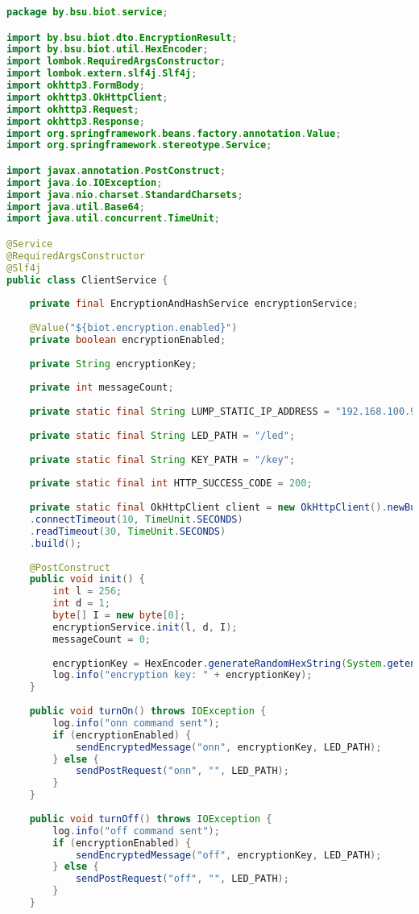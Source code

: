 \begin{lstlisting}[language=Java,label=client-code]
package by.bsu.biot.service;

import by.bsu.biot.dto.EncryptionResult;
import by.bsu.biot.util.HexEncoder;
import lombok.RequiredArgsConstructor;
import lombok.extern.slf4j.Slf4j;
import okhttp3.FormBody;
import okhttp3.OkHttpClient;
import okhttp3.Request;
import okhttp3.Response;
import org.springframework.beans.factory.annotation.Value;
import org.springframework.stereotype.Service;

import javax.annotation.PostConstruct;
import java.io.IOException;
import java.nio.charset.StandardCharsets;
import java.util.Base64;
import java.util.concurrent.TimeUnit;

@Service
@RequiredArgsConstructor
@Slf4j
public class ClientService {
	
	private final EncryptionAndHashService encryptionService;
	
	@Value("${biot.encryption.enabled}")
	private boolean encryptionEnabled;
	
	private String encryptionKey;
	
	private int messageCount;
	
	private static final String LUMP_STATIC_IP_ADDRESS = "192.168.100.93";
	
	private static final String LED_PATH = "/led";
	
	private static final String KEY_PATH = "/key";
	
	private static final int HTTP_SUCCESS_CODE = 200;
	
	private static final OkHttpClient client = new OkHttpClient().newBuilder()
	.connectTimeout(10, TimeUnit.SECONDS)
	.readTimeout(30, TimeUnit.SECONDS)
	.build();
	
	@PostConstruct
	public void init() {
		int l = 256;
		int d = 1;
		byte[] I = new byte[0];
		encryptionService.init(l, d, I);
		messageCount = 0;
		
		encryptionKey = HexEncoder.generateRandomHexString(System.getenv("INITIAL_ENCRYPTION_KEY").length());
		log.info("encryption key: " + encryptionKey);
	}
	
	public void turnOn() throws IOException {
		log.info("onn command sent");
		if (encryptionEnabled) {
			sendEncryptedMessage("onn", encryptionKey, LED_PATH);
		} else {
			sendPostRequest("onn", "", LED_PATH);
		}
	}
	
	public void turnOff() throws IOException {
		log.info("off command sent");
		if (encryptionEnabled) {
			sendEncryptedMessage("off", encryptionKey, LED_PATH);
		} else {
			sendPostRequest("off", "", LED_PATH);
		}
	}
	

\end{lstlisting}
